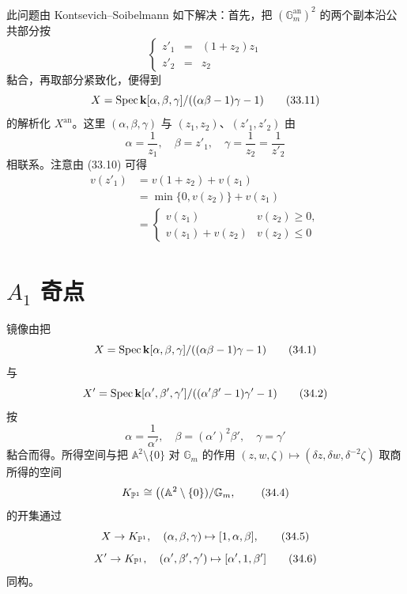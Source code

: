 此问题由 Kontsevich--Soibelmann 如下解决：首先，把 $(\mathbb{G}_m^{\mathrm{an}})^2$ 的两个副本沿公共部分按
\begin{equation}
\left\{
\begin{array}{rcl}
z'_1 & = & (1+z_2)z_1\\
z'_2 & = & z_2
\end{array}
\right. \tag{33.10}
\end{equation}
黏合，再取部分紧致化，便得到
\begin{equation}
X = \operatorname{Spec} \mathbf{k}[\alpha,\beta,\gamma]/((\alpha\beta-1)\gamma-1) \tag{33.11}
\end{equation}
的解析化 $X^{\mathrm{an}}$。这里 $(\alpha,\beta,\gamma)$ 与 $(z_1,z_2)$、$(z'_1,z'_2)$ 由
\begin{equation}
\alpha = \frac{1}{z_1},\quad \beta = z'_1,\quad \gamma = \frac{1}{z_2} = \frac{1}{z'_2} \tag{33.12}
\end{equation}
相联系。注意由 (33.10) 可得
\begin{align}
v(z'_1) &= v(1+z_2) + v(z_1) \tag{33.13}\\
&= \min\{0, v(z_2)\} + v(z_1) \tag{33.14}\\
&= \begin{cases}
v(z_1) & v(z_2) \ge 0,\\
v(z_1) + v(z_2) & v(z_2) \le 0
\end{cases} \tag{33.15}
\end{align}

\section{$A_1$ 奇点}

镜像由把
\begin{equation}
X = \operatorname{Spec} \mathbf{k}[\alpha,\beta,\gamma]/((\alpha\beta-1)\gamma-1) \tag{34.1}
\end{equation}
与
\begin{equation}
X' = \operatorname{Spec} \mathbf{k}[\alpha',\beta',\gamma']/((\alpha'\beta'-1)\gamma'-1) \tag{34.2}
\end{equation}
按
\begin{equation}
\alpha = \frac{1}{\alpha'},\quad \beta = (\alpha')^2\beta',\quad \gamma = \gamma' \tag{34.3}
\end{equation}
黏合而得。所得空间与把 $\mathbb{A}^2 \setminus \{0\}$ 对 $\mathbb{G}_m$ 的作用 $(z,w,\zeta) \mapsto (\delta z, \delta w, \delta^{-2}\zeta)$ 取商所得的空间
\begin{equation}
K_{\mathbb{P}^1} \cong \left((\mathbb{A}^2 \setminus \{0\})/\mathbb{G}_m,\right. \tag{34.4}
\end{equation}
的开集通过
\begin{equation}
X \to K_{\mathbb{P}^1},\quad (\alpha,\beta,\gamma) \mapsto [1,\alpha,\beta], \tag{34.5}
\end{equation}
\begin{equation}
X' \to K_{\mathbb{P}^1},\quad (\alpha',\beta',\gamma') \mapsto [\alpha',1,\beta'] \tag{34.6}
\end{equation}
同构。

